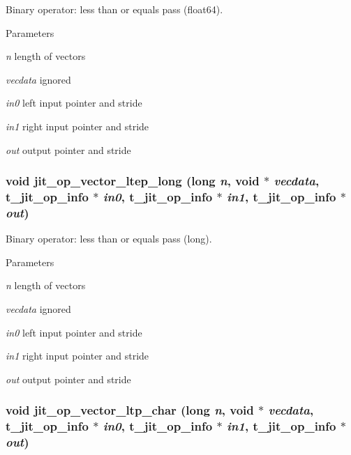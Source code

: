 Binary operator: less than or equals pass (float64). 
\begin{DoxyParams}{Parameters}
\item[{\em n}]length of vectors \item[{\em vecdata}]ignored \item[{\em in0}]left input pointer and stride \item[{\em in1}]right input pointer and stride \item[{\em out}]output pointer and stride \end{DoxyParams}
\hypertarget{group__opvecmod_gad0572850562b94c6f691d4a53bdb8eba}{
\subsubsection[{jit\_\-op\_\-vector\_\-ltep\_\-long}]{\setlength{\rightskip}{0pt plus 5cm}void jit\_\-op\_\-vector\_\-ltep\_\-long (long {\em n}, \/  void $\ast$ {\em vecdata}, \/  {\bf t\_\-jit\_\-op\_\-info} $\ast$ {\em in0}, \/  {\bf t\_\-jit\_\-op\_\-info} $\ast$ {\em in1}, \/  {\bf t\_\-jit\_\-op\_\-info} $\ast$ {\em out})}}
\label{group__opvecmod_gad0572850562b94c6f691d4a53bdb8eba}


Binary operator: less than or equals pass (long). 
\begin{DoxyParams}{Parameters}
\item[{\em n}]length of vectors \item[{\em vecdata}]ignored \item[{\em in0}]left input pointer and stride \item[{\em in1}]right input pointer and stride \item[{\em out}]output pointer and stride \end{DoxyParams}
\hypertarget{group__opvecmod_ga5bff93b6a9da2d5de668c7edd111fffa}{
\subsubsection[{jit\_\-op\_\-vector\_\-ltp\_\-char}]{\setlength{\rightskip}{0pt plus 5cm}void jit\_\-op\_\-vector\_\-ltp\_\-char (long {\em n}, \/  void $\ast$ {\em vecdata}, \/  {\bf t\_\-jit\_\-op\_\-info} $\ast$ {\em in0}, \/  {\bf t\_\-jit\_\-op\_\-info} $\ast$ {\em in1}, \/  {\bf t\_\-jit\_\-op\_\-info} $\ast$ {\em out})}}
\label{group__opvecmod_ga5bff93b6a9da2d5de668c7edd111fffa}


